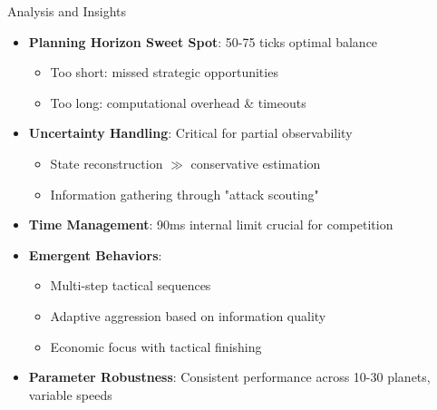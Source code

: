 \documentclass{beamer}
\begin{document}
\begin{frame}{Analysis and Insights}
  \begin{itemize}
    \item \textbf{Planning Horizon Sweet Spot}: 50-75 ticks optimal balance
    \begin{itemize}
      \item Too short: missed strategic opportunities
      \item Too long: computational overhead \& timeouts
    \end{itemize}
    \item \textbf{Uncertainty Handling}: Critical for partial observability
    \begin{itemize}
      \item State reconstruction $\gg$ conservative estimation
      \item Information gathering through "attack scouting"
    \end{itemize}
    \item \textbf{Time Management}: 90ms internal limit crucial for competition
    \item \textbf{Emergent Behaviors}: 
    \begin{itemize}
      \item Multi-step tactical sequences
      \item Adaptive aggression based on information quality
      \item Economic focus with tactical finishing
    \end{itemize}
    \item \textbf{Parameter Robustness}: Consistent performance across 10-30 planets, variable speeds
  \end{itemize}
\end{frame}
\end{document}
